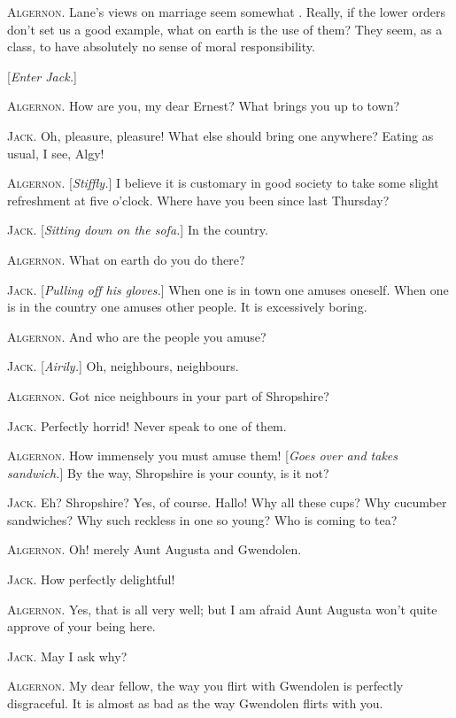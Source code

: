 \documentclass{fiche}
\begin{document}
\begin{texte}
\textsc{Algernon.} Lane's views on marriage seem somewhat . Really, if
the lower orders don't set us a good example, what on earth is the use of them? They seem, as
a class, to have absolutely no sense of moral responsibility.

[\emph{Enter Jack.}]

\textsc{Algernon.} How are you, my dear Ernest? What brings you up to town?

\textsc{Jack.} Oh, pleasure, pleasure! What else should bring one anywhere? Eating as usual, I
see, Algy!

\textsc{Algernon.} [\emph{Stiffly.}] I believe it is customary in good society to take some
slight refreshment at five o'clock. Where have you been since last Thursday?

\textsc{Jack.} [\emph{Sitting down on the sofa.}] In the country.

\textsc{Algernon.} What on earth do you do there?

\textsc{Jack.} [\emph{Pulling off his gloves.}] When one is in town one amuses oneself. When
one is in the country one amuses other people. It is excessively boring.

\textsc{Algernon.} And who are the people you amuse?

\textsc{Jack.} [\emph{Airily.}] Oh, neighbours, neighbours.

\textsc{Algernon.} Got nice neighbours in your part of Shropshire?

\textsc{Jack.} Perfectly horrid! Never speak to one of them.

\textsc{Algernon.} How immensely you must amuse them! [\emph{Goes over and takes sandwich.}]
By the way, Shropshire is your county, is it not?

\textsc{Jack.} Eh? Shropshire? Yes, of course. Hallo! Why all these cups? Why cucumber
sandwiches? Why such reckless  in one so young? Who is coming to tea?

\textsc{Algernon.} Oh! merely Aunt Augusta and Gwendolen.

\textsc{Jack.} How perfectly delightful!

\textsc{Algernon.} Yes, that is all very well; but I am afraid Aunt Augusta won't quite
approve of your being here.

\textsc{Jack.} May I ask why?

\textsc{Algernon.} My dear fellow, the way you flirt with Gwendolen is perfectly disgraceful.
It is almost as bad as the way Gwendolen flirts with you.
\end{texte}
\end{document}

